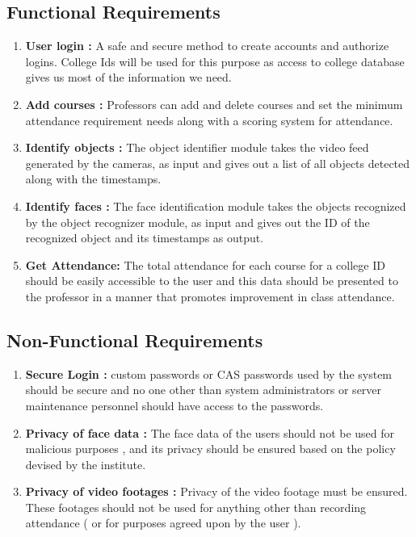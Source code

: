 \documentclass[10pt,twocolumn,letterpaper]{article}
\begin{document}
\subsection{Functional Requirements}
\begin{enumerate}
    \item \textbf {User login :} A safe and secure method to create accounts and authorize logins. College Ids will be used for this purpose as access to college database gives us most of the information we need.
 \item \textbf {Add courses : } Professors can add and delete courses and set the minimum attendance requirement needs along with a scoring system for attendance.
 \item \textbf {Identify objects :} The object identifier module takes the video feed generated by the cameras, as input and gives out a list of all objects detected along with the timestamps.
 \item \textbf {Identify faces :} The face identification module takes the objects recognized by the object recognizer module, as input and gives out the ID of the recognized object and its timestamps as output. 
 \item \textbf{Get Attendance: } The total attendance for each course for a college ID should be easily accessible to the user and this data should be presented to the professor in a manner that promotes improvement in class attendance.
\end{enumerate}
\subsection{Non-Functional Requirements}
\begin{enumerate}
    \item \textbf{Secure Login : } custom passwords or CAS passwords used by the system should be secure and no one other than system administrators or server maintenance personnel should have access to the passwords. 
    \item \textbf{Privacy of face data : } The face data of the users should not be used for malicious purposes , and its privacy should be ensured based on the policy devised by the institute.
    \item \textbf{Privacy of video footages : } Privacy of the video footage must be ensured. These footages should not be used for anything other than recording attendance ( or for purposes agreed upon by the user ).
\end{enumerate}
\end{document}
